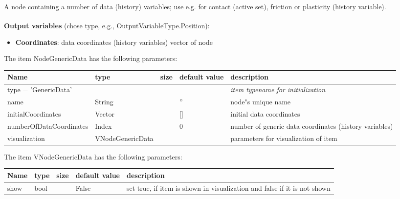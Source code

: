 A node containing a number of data (history) variables; use e.g. for contact (active set), friction or plasticity (history variable).
 \\\\ 
{\bf Output variables} (chose type, e.g., OutputVariableType.Position): 
\begin{itemize}
    \item {\bf Coordinates}: data coordinates (history variables) vector of node
\end{itemize}
The item NodeGenericData has the following parameters:
\begin{center}
  \footnotesize
  \begin{longtable}{| p{4.5cm} | p{2.5cm} | p{0.5cm} | p{2.5cm} | p{6cm} |}
    \hline
    \bf Name & \bf type & \bf size & \bf default value & \bf description \\ \hline
    \multicolumn{4}{l}{\parbox{10cm}{type = 'GenericData'}} & \multicolumn{1}{l}{\parbox{6cm}{\it item typename for initialization}}\\ \hline
    name &     String &      &     '' &     node"s unique name\\ \hline
    initialCoordinates &     Vector &      &     [] &     initial data coordinates\\ \hline
    numberOfDataCoordinates &     Index &      &     0 &     number of generic data coordinates (history variables)\\ \hline
    visualization & VNodeGenericData & & & parameters for visualization of item \\ \hline
	  \end{longtable}
	\end{center}
The item VNodeGenericData has the following parameters:
\begin{center}
  \footnotesize
  \begin{longtable}{| p{4.5cm} | p{2.5cm} | p{0.5cm} | p{2.5cm} | p{6cm} |}
    \hline
    \bf Name & \bf type & \bf size & \bf default value & \bf description \\ \hline
    show &     bool &      &     False &     set true, if item is shown in visualization and false if it is not shown\\ \hline
	  \end{longtable}
	\end{center}

